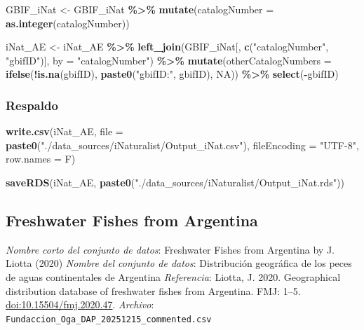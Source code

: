\documentclass[sn-apa,pdflatex]{sn-jnl}
\newenvironment{Shaded}{\begin{snugshade}}{\end{snugshade}}
\newcommand{\AttributeTok}[1]{\textcolor[rgb]{0.13,0.29,0.53}{#1}}
\newcommand{\ConstantTok}[1]{\textcolor[rgb]{0.56,0.35,0.01}{#1}}
\newcommand{\FunctionTok}[1]{\textcolor[rgb]{0.13,0.29,0.53}{\textbf{#1}}}
\newcommand{\NormalTok}[1]{#1}
\newcommand{\OtherTok}[1]{\textcolor[rgb]{0.56,0.35,0.01}{#1}}
\newcommand{\SpecialCharTok}[1]{\textcolor[rgb]{0.81,0.36,0.00}{\textbf{#1}}}
\newcommand{\StringTok}[1]{\textcolor[rgb]{0.31,0.60,0.02}{#1}}
\begin{document}
\begin{Shaded}
\begin{Highlighting}[]
\NormalTok{GBIF\_iNat }\OtherTok{\textless{}{-}}\NormalTok{ GBIF\_iNat }\SpecialCharTok{\%\textgreater{}\%}
    \FunctionTok{mutate}\NormalTok{(}\AttributeTok{catalogNumber =} \FunctionTok{as.integer}\NormalTok{(catalogNumber))}

\NormalTok{iNat\_AE }\OtherTok{\textless{}{-}}\NormalTok{ iNat\_AE }\SpecialCharTok{\%\textgreater{}\%}
    \FunctionTok{left\_join}\NormalTok{(GBIF\_iNat[, }\FunctionTok{c}\NormalTok{(}\StringTok{"catalogNumber"}\NormalTok{, }\StringTok{"gbifID"}\NormalTok{)], }\AttributeTok{by =} \StringTok{"catalogNumber"}\NormalTok{) }\SpecialCharTok{\%\textgreater{}\%}
    \FunctionTok{mutate}\NormalTok{(}\AttributeTok{otherCatalogNumbers =} \FunctionTok{ifelse}\NormalTok{(}\SpecialCharTok{!}\FunctionTok{is.na}\NormalTok{(gbifID), }\FunctionTok{paste0}\NormalTok{(}\StringTok{"gbifID:"}\NormalTok{,}
\NormalTok{        gbifID), }\ConstantTok{NA}\NormalTok{)) }\SpecialCharTok{\%\textgreater{}\%}
    \FunctionTok{select}\NormalTok{(}\SpecialCharTok{{-}}\NormalTok{gbifID)}
\end{Highlighting}
\end{Shaded}

\subsubsection{Respaldo}\label{respaldo-9}

\begin{Shaded}
\begin{Highlighting}[]
\FunctionTok{write.csv}\NormalTok{(iNat\_AE, }\AttributeTok{file =} \FunctionTok{paste0}\NormalTok{(}\StringTok{"./data\_sources/iNaturalist/Output\_iNat.csv"}\NormalTok{),}
    \AttributeTok{fileEncoding =} \StringTok{"UTF{-}8"}\NormalTok{, }\AttributeTok{row.names =}\NormalTok{ F)}

\FunctionTok{saveRDS}\NormalTok{(iNat\_AE, }\FunctionTok{paste0}\NormalTok{(}\StringTok{"./data\_sources/iNaturalist/Output\_iNat.rds"}\NormalTok{))}
\end{Highlighting}
\end{Shaded}

\subsection{Freshwater Fishes from
Argentina}\label{freshwater-fishes-from-argentina}

\emph{Nombre corto del conjunto de datos}: Freshwater Fishes from
Argentina by J. Liotta (2020) \emph{Nombre del conjunto de datos}:
Distribución geográfica de los peces de aguas continentales de Argentina
\emph{Referencia}: Liotta, J. 2020. Geographical distribution database
of freshwater fishes from Argentina. FMJ: 1--5.
\url{doi:10.15504/fmj.2020.47}. \citep{Liotta2020} \emph{Archivo}:
\texttt{Fundaccion\_Oga\_DAP\_20251215\_commented.csv}
\end{document}
